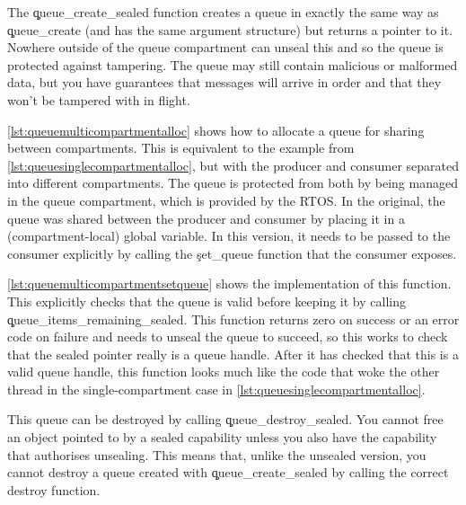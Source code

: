 The \c{queue_create_sealed} function creates a queue in exactly the same way as \c{queue_create} (and has the same argument structure) but returns a  pointer to it.
Nowhere outside of the queue compartment can unseal this and so the queue is protected against tampering.
The queue may still contain malicious or malformed data, but you have guarantees that messages will arrive in order and that they won't be tampered with in flight.


\ref{lst:queuemulticompartmentalloc} shows how to allocate a queue for sharing between compartments.
This is equivalent to the example from \ref{lst:queuesinglecompartmentalloc}, but with the producer and consumer separated into different compartments.
The queue is protected from both by being managed in the queue compartment, which is provided by the RTOS.
In the original, the queue was shared between the producer and consumer by placing it in a (compartment-local) global variable.
In this version, it needs to be passed to the consumer explicitly by calling the \c{set_queue} function that the consumer exposes.

\codelisting[filename=examples/producer_consumer_compartment/producer.cc,marker=queue_allocate,label=lst:queuemulticompartmentalloc,caption="Allocating a message queue for use in a between compartments."]{}

\ref{lst:queuemulticompartmentsetqueue} shows the implementation of this function.
This explicitly checks that the queue is valid before keeping it by calling \c{queue_items_remaining_sealed}.
This function returns zero on success or an error code on failure and needs to unseal the queue to succeed, so this works to check that the sealed pointer really is a queue handle.
After it has checked that this is a valid queue handle, this function looks much like the code that woke the other thread in the single-compartment case in \ref{lst:queuesinglecompartmentalloc}.

\codelisting[filename=examples/producer_consumer_compartment/consumer.cc,marker=set_queue,label=lst:queuemulticompartmentsetqueue,caption="Receiving a queue endpoint in the consumer compartment."]{}

This queue can be destroyed by calling \c{queue_destroy_sealed}.
You cannot free an object pointed to by a sealed capability unless you also have the capability that authorises unsealing.
This means that, unlike the unsealed version, you cannot destroy a queue created with \c{queue_create_sealed}  by calling the correct destroy function.

